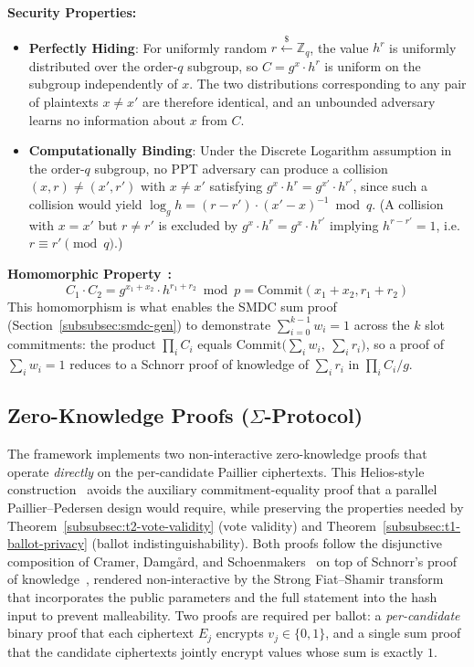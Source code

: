 \textbf{Security Properties:}
\begin{itemize}
    \item \textbf{Perfectly Hiding}: For uniformly random $r \stackrel{\$}{\leftarrow} \mathbb{Z}_q$, the value $h^r$ is uniformly distributed over the order-$q$ subgroup, so $C = g^x \cdot h^r$ is uniform on the subgroup independently of $x$. The two distributions corresponding to any pair of plaintexts $x \neq x'$ are therefore identical, and an unbounded adversary learns no information about $x$ from $C$.
    \item \textbf{Computationally Binding}: Under the Discrete Logarithm assumption in the order-$q$ subgroup, no PPT adversary can produce a collision $(x, r) \neq (x', r')$ with $x \neq x'$ satisfying $g^x \cdot h^r = g^{x'} \cdot h^{r'}$, since such a collision would yield $\log_g h = (r - r') \cdot (x' - x)^{-1} \bmod q$. (A collision with $x = x'$ but $r \neq r'$ is excluded by $g^x \cdot h^r = g^x \cdot h^{r'}$ implying $h^{r - r'} = 1$, i.e.\ $r \equiv r' \pmod{q}$.)
\end{itemize}

\textbf{Homomorphic Property}~\cite{pedersen1991}\textbf{:}
\begin{equation}
    C_1 \cdot C_2 = g^{x_1+x_2} \cdot h^{r_1+r_2} \bmod p = \text{Commit}(x_1 + x_2, r_1 + r_2)
    \label{eq:pedersen-homo}
\end{equation}
This homomorphism is what enables the SMDC sum proof (Section~\ref{subsubsec:smdc-gen}) to demonstrate $\sum_{i=0}^{k-1} w_i = 1$ across the $k$ slot commitments: the product $\prod_i C_i$ equals $\text{Commit}\big(\sum_i w_i,\ \sum_i r_i\big)$, so a proof of $\sum_i w_i = 1$ reduces to a Schnorr proof of knowledge of $\sum_i r_i$ in $\prod_i C_i / g$.

\subsection{Zero-Knowledge Proofs ($\Sigma$-Protocol)}
\label{subsec:zkp}

The framework implements two non-interactive zero-knowledge proofs that operate \emph{directly} on the per-candidate Paillier ciphertexts. This Helios-style construction~\cite{adida2008helios} avoids the auxiliary commitment-equality proof that a parallel Paillier--Pedersen design would require, while preserving the properties needed by Theorem~\ref{subsubsec:t2-vote-validity} (vote validity) and Theorem~\ref{subsubsec:t1-ballot-privacy} (ballot indistinguishability). Both proofs follow the disjunctive composition of Cramer, Damg{\aa}rd, and Schoenmakers~\cite{cramer1994or} on top of Schnorr's proof of knowledge~\cite{schnorr1991}, rendered non-interactive by the Strong Fiat--Shamir transform~\cite{fiat_shamir1986,bernhard2012} that incorporates the public parameters and the full statement into the hash input to prevent malleability. Two proofs are required per ballot: a \emph{per-candidate} binary proof that each ciphertext $E_j$ encrypts $v_j \in \{0,1\}$, and a single sum proof that the candidate ciphertexts jointly encrypt values whose sum is exactly $1$.

